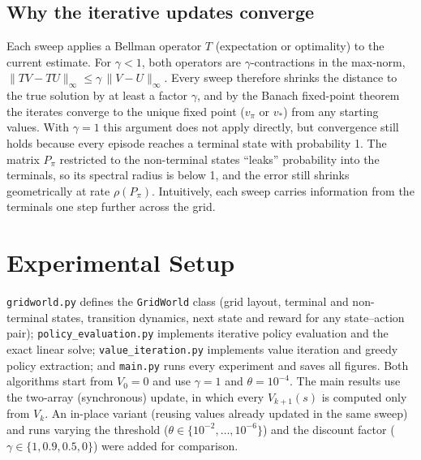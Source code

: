 \documentclass[11pt]{article}
\begin{document}
\subsection{Why the iterative updates converge}
Each sweep applies a Bellman operator $T$ (expectation or optimality) to the current estimate.
For $\gamma < 1$, both operators are $\gamma$-contractions in the max-norm,
$\|TV - TU\|_\infty \le \gamma\, \|V - U\|_\infty$. Every sweep therefore shrinks the distance to the true solution by at least a factor $\gamma$,
and by the Banach fixed-point theorem the iterates converge to the unique fixed point
($v_\pi$ or $v_*$) from any starting values. With $\gamma = 1$ this argument does not apply
directly, but convergence still holds because every episode reaches a terminal state with
probability 1. The matrix $P_\pi$ restricted to the non-terminal states ``leaks'' probability
into the terminals, so its spectral radius is below 1, and the error still shrinks
geometrically at rate $\rho(P_\pi)$. Intuitively, each sweep carries information from the terminals one step further across the grid.

\section{Experimental Setup}
\texttt{gridworld.py} defines the \texttt{GridWorld} class (grid layout, terminal and non-terminal states, transition dynamics,
next state and reward for any state--action pair); \texttt{policy\_evaluation.py} implements
iterative policy evaluation and the exact linear solve; \texttt{value\_iteration.py}
implements value iteration and greedy policy extraction; and \texttt{main.py} runs every
experiment and saves all figures.
Both algorithms start from $V_0 = 0$ and use $\gamma = 1$ and $\theta = 10^{-4}$. The main
results use the two-array (synchronous) update, in which every $V_{k+1}(s)$ is computed only
from $V_k$. An in-place variant (reusing values already updated in the same sweep) and runs varying the threshold
($\theta \in \{10^{-2}, \dots, 10^{-6}\}$) and the discount factor
($\gamma \in \{1, 0.9, 0.5, 0\}$) were added for comparison.
\end{document}
